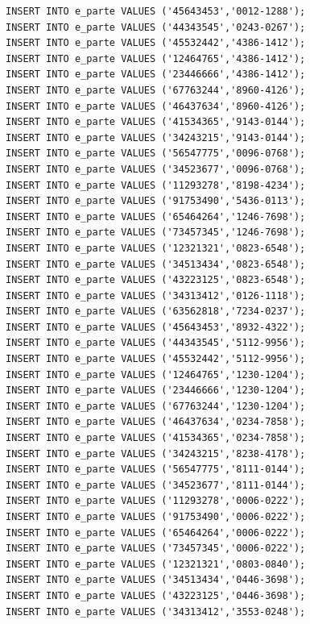 \documentclass[12pt]{report}
\begin{document}
\begin{scriptsize}
\begin{verbatim}
INSERT INTO e_parte VALUES ('45643453','0012-1288');
INSERT INTO e_parte VALUES ('44343545','0243-0267');
INSERT INTO e_parte VALUES ('45532442','4386-1412');
INSERT INTO e_parte VALUES ('12464765','4386-1412');
INSERT INTO e_parte VALUES ('23446666','4386-1412');
INSERT INTO e_parte VALUES ('67763244','8960-4126');
INSERT INTO e_parte VALUES ('46437634','8960-4126');
INSERT INTO e_parte VALUES ('41534365','9143-0144');
INSERT INTO e_parte VALUES ('34243215','9143-0144');
INSERT INTO e_parte VALUES ('56547775','0096-0768');
INSERT INTO e_parte VALUES ('34523677','0096-0768');
INSERT INTO e_parte VALUES ('11293278','8198-4234');
INSERT INTO e_parte VALUES ('91753490','5436-0113');
INSERT INTO e_parte VALUES ('65464264','1246-7698');
INSERT INTO e_parte VALUES ('73457345','1246-7698');
INSERT INTO e_parte VALUES ('12321321','0823-6548');
INSERT INTO e_parte VALUES ('34513434','0823-6548');
INSERT INTO e_parte VALUES ('43223125','0823-6548');
INSERT INTO e_parte VALUES ('34313412','0126-1118');
INSERT INTO e_parte VALUES ('63562818','7234-0237');
INSERT INTO e_parte VALUES ('45643453','8932-4322');
INSERT INTO e_parte VALUES ('44343545','5112-9956');
INSERT INTO e_parte VALUES ('45532442','5112-9956');
INSERT INTO e_parte VALUES ('12464765','1230-1204');
INSERT INTO e_parte VALUES ('23446666','1230-1204');
INSERT INTO e_parte VALUES ('67763244','1230-1204');
INSERT INTO e_parte VALUES ('46437634','0234-7858');
INSERT INTO e_parte VALUES ('41534365','0234-7858');
INSERT INTO e_parte VALUES ('34243215','8238-4178');
INSERT INTO e_parte VALUES ('56547775','8111-0144');
INSERT INTO e_parte VALUES ('34523677','8111-0144');
INSERT INTO e_parte VALUES ('11293278','0006-0222');
INSERT INTO e_parte VALUES ('91753490','0006-0222');
INSERT INTO e_parte VALUES ('65464264','0006-0222');
INSERT INTO e_parte VALUES ('73457345','0006-0222');
INSERT INTO e_parte VALUES ('12321321','0803-0840');
INSERT INTO e_parte VALUES ('34513434','0446-3698');
INSERT INTO e_parte VALUES ('43223125','0446-3698');
INSERT INTO e_parte VALUES ('34313412','3553-0248');


\end{verbatim}
\end{scriptsize}
\end{document}
